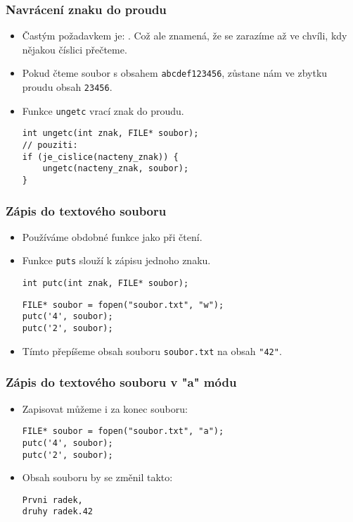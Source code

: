 \documentclass{beamer}
\newenvironment{itemizex}%
  {\large \begin{itemize}%
    \setlength{\itemsep}{8pt}%
    \setlength{\parskip}{8pt}}%
  {\end{itemize}}
\newenvironment{itemizey}%
  {\large \begin{itemize}%
    \setlength{\itemsep}{6pt}%
    \setlength{\parskip}{6pt}}%
  {\end{itemize}}
\begin{document}
\begin{frame}[t,fragile]\frametitle{Navrácení znaku do proudu} 
    \begin{itemizey}
        \item Častým požadavkem je: . Což ale znamená, že se zarazíme až ve chvíli, kdy nějakou číslici přečteme.
        \item Pokud čteme soubor s obsahem \texttt{abcdef123456}, zůstane nám ve zbytku proudu obsah \texttt{23456}.
        \item Funkce \texttt{ungetc} vrací znak do proudu. 
\begin{verbatim} 
int ungetc(int znak, FILE* soubor);
// pouziti:
if (je_cislice(nacteny_znak)) {
    ungetc(nacteny_znak, soubor);
}
\end{verbatim}
    \end{itemizey}
\end{frame}


\begin{frame}[t,fragile]\frametitle{Zápis do textového souboru} 
    \begin{itemizex}
        \item Používáme obdobné funkce jako při čtení.
        \item Funkce \texttt{puts} slouží k zápisu jednoho znaku.
\begin{verbatim} 
int putc(int znak, FILE* soubor);
\end{verbatim}

\begin{verbatim} 
FILE* soubor = fopen("soubor.txt", "w");
putc('4', soubor);
putc('2', soubor);
\end{verbatim}
        \item Tímto přepíšeme obsah souboru \texttt{soubor.txt} na obsah \texttt{"42"}.
    \end{itemizex}
\end{frame}


\begin{frame}[t,fragile]\frametitle{Zápis do textového souboru v "a" módu} 
    \begin{itemizex}
        \item Zapisovat můžeme i za konec souboru:
\begin{verbatim} 
FILE* soubor = fopen("soubor.txt", "a");
putc('4', soubor);
putc('2', soubor);
\end{verbatim}
        \item Obsah souboru by se změnil takto:
\begin{verbatim} 
Prvni radek,
druhy radek.42
\end{verbatim}
    \end{itemizex}
\end{frame}
\end{document}
